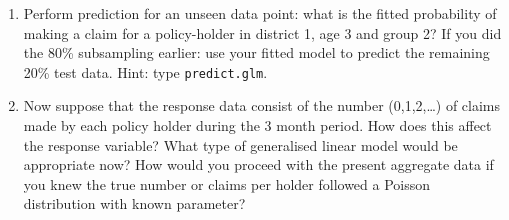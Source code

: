 \begin{enumerate}
\item Perform prediction for an unseen data point: what is the fitted probability of making a claim
for a policy-holder in district 1, age 3 and group 2? If you did the 80\% subsampling earlier: use your fitted model to predict the remaining 20\% test data. Hint: type \texttt{predict.glm}.

\item Now suppose that the response data consist of the number (0,1,2,\ldots) of claims made by each policy holder during the 3 month period.
How does this affect the response variable? What type of generalised linear model would be appropriate now? How would you proceed with the present aggregate data if you knew the true number or claims per holder followed a Poisson distribution with known parameter?

\end{enumerate}





